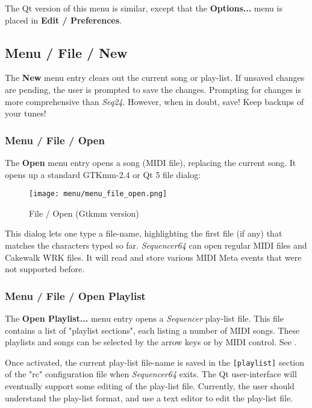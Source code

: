    The Qt version of this menu is similar, except that the
   \textbf{Options...} menu is placed in \textbf{Edit / Preferences}.

\subsection{Menu / File / New}
\label{subsec:menu_file_new}

   The \textbf{New} menu entry clears out the current song or
   play-list.
   If unsaved changes are pending, the user is prompted to save the
   changes.  Prompting for changes is more comprehensive than \textsl{Seq24}.
   However, when in doubt, save!  Keep backups of your tunes!

\subsubsection{Menu / File / Open}
\label{subsubsec:seq64_menu_file_open}

   The \textbf{Open} menu entry opens a song (MIDI file), replacing the current
   song.  It opens up a standard GTKmm-2.4 or Qt 5 file dialog:

\begin{figure}[H]
   \centering 
   \texttt{[image: menu/menu\_file\_open.png]}
   \caption{File / Open (Gtkmm version)}
   \label{fig:seq64_menu_file_open}
\end{figure}

   This dialog lets one type a file-name, highlighting the first file (if any)
   that matches the characters typed so far.
   \textsl{Sequencer64} can open regular MIDI files and
   Cakewalk WRK files.
   It will read and store various MIDI Meta events that
   were not supported before.

\subsubsection{Menu / File / Open Playlist}
\label{subsubsec:seq64_menu_file_open}

   The \textbf{Open Playlist...} menu entry opens a \textsl{Sequencer}
   play-list file.  This file contains a list of "playlist sections",
   each listing a number of MIDI songs.  These playlists and songs can be
   selected by the arrow keys or by MIDI control.
   See .

   Once activated, the current play-list file-name is saved in the
   \texttt{[playlist]} section of the "rc" configuration file when
   \textsl{Sequencer64} exits.
   The Qt user-interface will eventually support some editing of the play-list
   file.  Currently, the user should understand the play-list format, and use a
   text editor to edit the play-list file.

